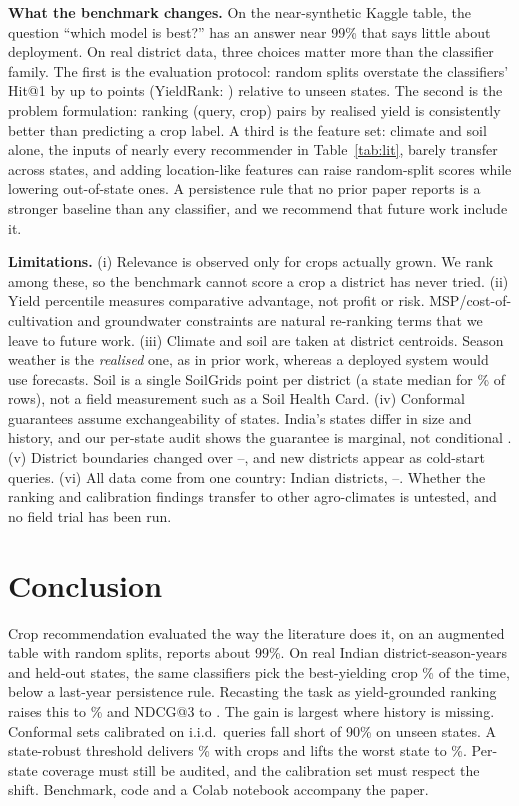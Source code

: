 \documentclass[conference]{IEEEtran}
\begin{document}
\textbf{What the benchmark changes.} On the near-synthetic Kaggle table, the question ``which
model is best?'' has an answer near 99\% that says little about deployment. On real district
data, three choices matter more than the classifier family. The first is the evaluation protocol:
random splits overstate the classifiers' Hit@1 by up to
\ClfDropMax{} points (YieldRank: \OursDrop) relative to unseen states. The second is the problem formulation: ranking
(query, crop) pairs by realised yield is consistently better than predicting a crop label.
A third is the feature set: climate and soil alone, the inputs of nearly every recommender in
Table~\ref{tab:lit}, barely transfer across states, and adding location-like features can
raise random-split scores while lowering out-of-state ones. A persistence rule that no prior
paper reports is a stronger baseline than any classifier, and we recommend that future work
include it.

\textbf{Limitations.} (i) Relevance is observed only for crops actually grown. We rank among
these, so the benchmark cannot score a crop a district has never tried. (ii) Yield percentile
measures comparative advantage, not profit or risk. MSP/cost-of-cultivation and groundwater
constraints \cite{sam2025,devineni2022,dangar2024} are natural re-ranking terms that we leave to
future work. (iii) Climate and soil are taken at district centroids. Season weather is the
\emph{realised} one, as in prior work, whereas a deployed system would use forecasts. Soil
is a single SoilGrids point per district (a state median for \SoilMedPct\% of rows), not a
field measurement such as a Soil Health Card. (iv) Conformal guarantees assume exchangeability of states. India's states
differ in size and history, and our per-state audit shows the guarantee is marginal, not
conditional \cite{barber2023}. (v) District boundaries changed over \YearA--\YearB, and new districts
appear as cold-start queries. (vi) All data come from one country: Indian districts, \YearA--\YearB. Whether the ranking
and calibration findings transfer to other agro-climates is untested, and no field trial has been
run.


\section{Conclusion}

Crop recommendation evaluated the way the literature does it, on an augmented table with
random splits, reports about 99\%. On \NQueries{} real Indian district-season-years and held-out
states, the same classifiers pick the best-yielding crop \BaseHitLSO\% of the time, below a
last-year persistence rule. Recasting the task as yield-grounded ranking raises this to
\OursHitLSO\% and NDCG@3 to \OursNDCGLSO. The gain is largest where history is missing.
Conformal sets calibrated on i.i.d.\ queries fall short of 90\% on unseen states. A
state-robust threshold delivers \CCSRCovLSO\% with \CCSRSizeLSO{} crops and lifts the worst state
to \SRWorstCov\%. Per-state coverage must still be audited, and the calibration set must respect
the shift. Benchmark,
code and a Colab notebook accompany the paper.
\end{document}
